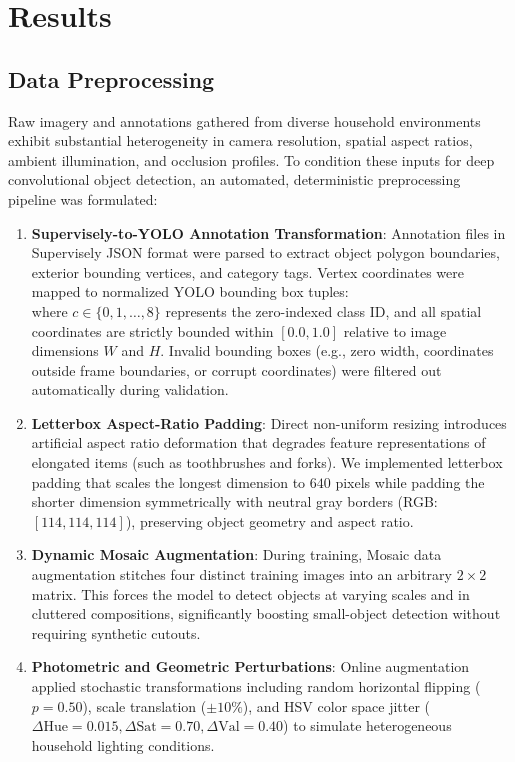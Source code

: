 \chapter{Results}
\label{chap:results}

\section{Data Preprocessing}
\label{sec:data_preprocessing}

Raw imagery and annotations gathered from diverse household environments exhibit substantial heterogeneity in camera resolution, spatial aspect ratios, ambient illumination, and occlusion profiles. To condition these inputs for deep convolutional object detection, an automated, deterministic preprocessing pipeline was formulated:

\begin{enumerate}
    \item \textbf{Supervisely-to-YOLO Annotation Transformation}: Annotation files in Supervisely JSON format were parsed to extract object polygon boundaries, exterior bounding vertices, and category tags. Vertex coordinates were mapped to normalized YOLO bounding box tuples:
    \begin{equation}
        [c, x_{\text{center}}, y_{\text{center}}, w, h]
    \end{equation}
    where $c \in \{0, 1, \dots, 8\}$ represents the zero-indexed class ID, and all spatial coordinates are strictly bounded within $[0.0, 1.0]$ relative to image dimensions $W$ and $H$. Invalid bounding boxes (e.g., zero width, coordinates outside frame boundaries, or corrupt coordinates) were filtered out automatically during validation.
    \item \textbf{Letterbox Aspect-Ratio Padding}: Direct non-uniform resizing introduces artificial aspect ratio deformation that degrades feature representations of elongated items (such as toothbrushes and forks). We implemented letterbox padding that scales the longest dimension to $640$ pixels while padding the shorter dimension symmetrically with neutral gray borders (RGB: $[114, 114, 114]$), preserving object geometry and aspect ratio.
    \item \textbf{Dynamic Mosaic Augmentation}: During training, Mosaic data augmentation stitches four distinct training images into an arbitrary $2 \times 2$ matrix. This forces the model to detect objects at varying scales and in cluttered compositions, significantly boosting small-object detection without requiring synthetic cutouts.
    \item \textbf{Photometric and Geometric Perturbations}: Online augmentation applied stochastic transformations including random horizontal flipping ($p=0.50$), scale translation ($\pm 10\%$), and HSV color space jitter ($\Delta\text{Hue} = 0.015, \Delta\text{Sat} = 0.70, \Delta\text{Val} = 0.40$) to simulate heterogeneous household lighting conditions.
\end{enumerate}

